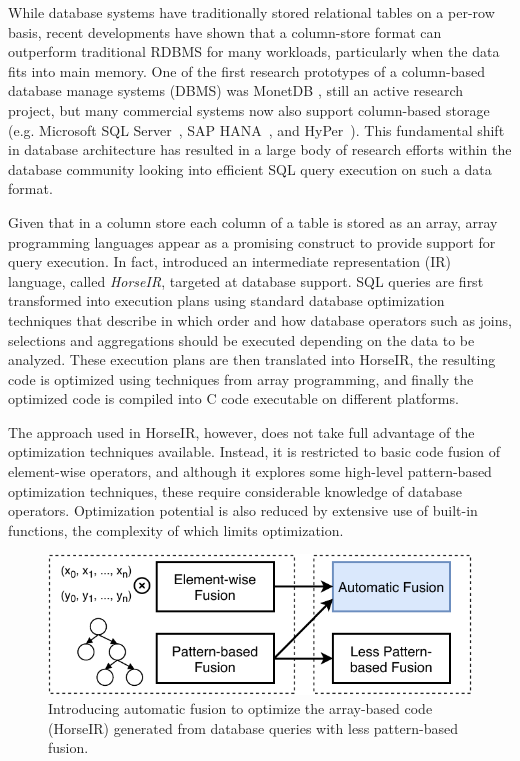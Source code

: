 
While database systems have traditionally stored relational tables on a per-row
basis, recent developments have shown that a column-store format can outperform
traditional RDBMS for many workloads, particularly when the data fits into
main memory.
One of the first research prototypes of a column-based database manage systems
(DBMS) was MonetDB \cite{IdreosS2012}, still an active research project, but
many commercial systems now also support column-based storage (e.g.
Microsoft SQL Server~\cite{msqlserver},
SAP HANA~\cite{FarberF2012}, and
HyPer~\cite{Neumann2011:HyPer}).
This fundamental shift in database architecture has resulted in a large body of
research efforts within the database community looking into efficient SQL query
execution on such a data format.

Given that in a column store each column of a table is stored as an array,
array programming languages appear as a promising construct to provide support
for query execution. In fact, \OldPaperAuthor introduced an intermediate
representation (IR) language, called \textit{HorseIR}, targeted at database
support.  SQL queries are first transformed into execution plans using
standard database optimization techniques that describe in which order and
how database operators such as joins, selections and aggregations should be
executed depending on the data to be analyzed. These execution plans are
then translated into HorseIR, the resulting code is optimized using
techniques from array programming, and finally the optimized code is
compiled into C code executable on different platforms.

The approach used in HorseIR, however, does not take full advantage of the
optimization techniques available. Instead, it is restricted to basic code
fusion of element-wise operators, and although it explores some high-level
pattern-based optimization techniques, these require considerable knowledge of
database operators.  Optimization potential is also reduced by extensive use of
built-in functions, the complexity of which limits optimization.

\begin{figure}[htbp]
\centering
\includegraphics[width=.95\columnwidth]{./src/figure/basic-idea.pdf}
\caption{Introducing automatic fusion to optimize the array-based code
(HorseIR) generated from database queries with less pattern-based fusion.}
\label{fig:fusion_idea}
\end{figure}

